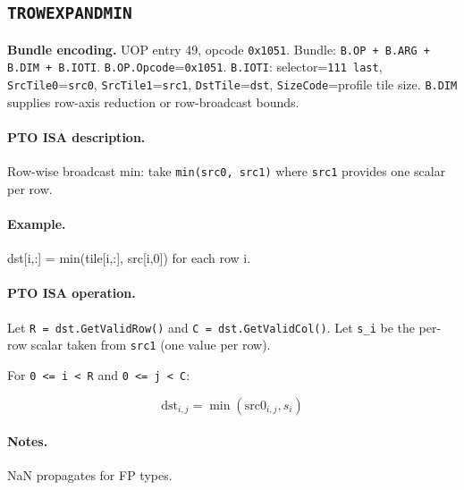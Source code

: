 \subsection{\texttt{TROWEXPANDMIN}}
\noindent\textbf{Bundle encoding.} UOP entry 49, opcode \texttt{0x1051}. Bundle: \texttt{B.OP + B.ARG + B.DIM + B.IOTI}. \texttt{B.OP.Opcode}=\texttt{0x1051}. \texttt{B.IOTI}: selector=\texttt{111 last}, \texttt{SrcTile0}=\texttt{src0}, \texttt{SrcTile1}=\texttt{src1}, \texttt{DstTile}=\texttt{dst}, \texttt{SizeCode}=profile tile size. \texttt{B.DIM} supplies row-axis reduction or row-broadcast bounds.\par\smallskip
{\small
\paragraph{PTO ISA description.}
Row-wise broadcast min: take \texttt{min(src0, src1)} where \texttt{src1} provides one scalar per row.
\paragraph{Example.}
dst[i,:] = min(tile[i,:], src[i,0]) for each row i.
\par\smallskip
\paragraph{PTO ISA operation.}
Let \texttt{R = dst.GetValidRow()} and \texttt{C = dst.GetValidCol()}. Let \texttt{s\_i} be the per-row scalar taken from \texttt{src1} (one value per row).

For \texttt{0 \textless{}= i \textless{} R} and \texttt{0 \textless{}= j \textless{} C}:

\[
\mathrm{dst}_{i,j} = \min(\mathrm{src0}_{i,j}, s_i)
\]
}\par\smallskip
\paragraph{Notes.}
NaN propagates for FP types.
